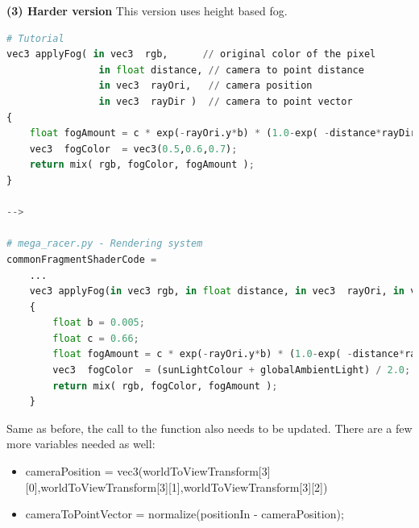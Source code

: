 \documentclass[a4 paper, 12pt]{article}
\begin{document}
\textbf{(3) Harder version}
This version uses height based fog.
\begin{lstlisting}[language=python]
# Tutorial
vec3 applyFog( in vec3  rgb,      // original color of the pixel
                in float distance, // camera to point distance
                in vec3  rayOri,   // camera position
                in vec3  rayDir )  // camera to point vector
{
    float fogAmount = c * exp(-rayOri.y*b) * (1.0-exp( -distance*rayDir.y*b ))/rayDir.y;
    vec3  fogColor  = vec3(0.5,0.6,0.7);
    return mix( rgb, fogColor, fogAmount );
}

-->

# mega_racer.py - Rendering system
commonFragmentShaderCode = 
    ...
    vec3 applyFog(in vec3 rgb, in float distance, in vec3  rayOri, in vec3 rayDir)
    {
        float b = 0.005;
        float c = 0.66;
        float fogAmount = c * exp(-rayOri.y*b) * (1.0-exp( -distance*rayDir.y*b ))/rayDir.y;
        vec3  fogColor  = (sunLightColour + globalAmbientLight) / 2.0;
        return mix( rgb, fogColor, fogAmount );
    }
\end{lstlisting} 

Same as before, the call to the function also needs to be updated. There are a few more variables needed as well:
    \begin{itemize}
        \item cameraPosition = vec3(worldToViewTransform[3][0],worldToViewTransform[3][1],worldToViewTransform[3][2])
        \item cameraToPointVector = normalize(positionIn - cameraPosition);
    \end{itemize}
\end{document}

